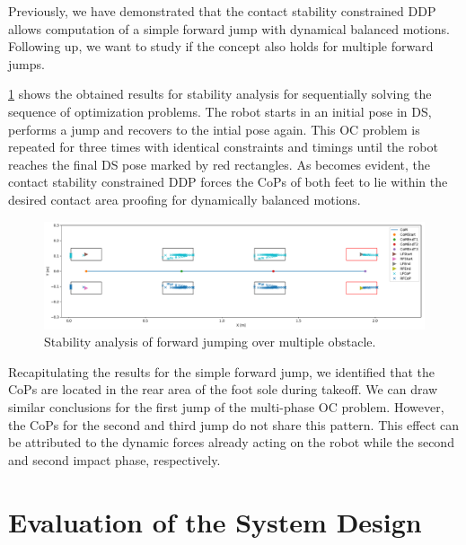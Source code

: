Previously, we have demonstrated that the contact stability constrained \gls{DDP} allows computation of a simple forward jump with dynamical balanced motions. Following up, we want to study if the concept also holds for multiple forward jumps. 

\cref{fig:jumpObstacles_StabilityAnalysis} shows the obtained results for stability analysis for sequentially solving the sequence of optimization problems. The robot starts in an initial pose in \gls{DS}, performs a jump and recovers to the intial pose again. This \gls{OC} problem is repeated for three times with identical constraints and timings until the robot reaches the final \gls{DS} pose marked by red rectangles. As becomes evident, the contact stability constrained \gls{DDP} forces the \gls{CoP}s of both feet to lie within the desired contact area proofing for dynamically balanced motions. 

\begin{figure}[h!]
\centering	
\includegraphics[width=1\textwidth]{fig/jumpObstacles/StabilityAnalysis}
\caption{Stability analysis of forward jumping over multiple obstacle.}
\label{fig:jumpObstacles_StabilityAnalysis}
\end{figure}

Recapitulating the results for the simple forward jump, we identified that the \gls{CoP}s are located in the rear area of the foot sole during takeoff. We can draw similar conclusions for the first jump of the multi-phase \gls{OC} problem. However, the \gls{CoP}s for the second and third jump do not share this pattern. This effect can be attributed to the dynamic forces already acting on the robot while the second and second impact phase, respectively.


\section{Evaluation of the System Design}

